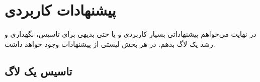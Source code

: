 \section{پیشنهادات کاربردی}

در نهایت می‌خواهم پیشنهاداتی بسیار کاربردی و یا حتی بدیهی برای تاسیس،
نگهداری و رشد یک لاگ بدهم. در هر بخش لیستی از پیشنهادات وجود خواهد داشت.

\subsection{تاسیس یک لاگ}

